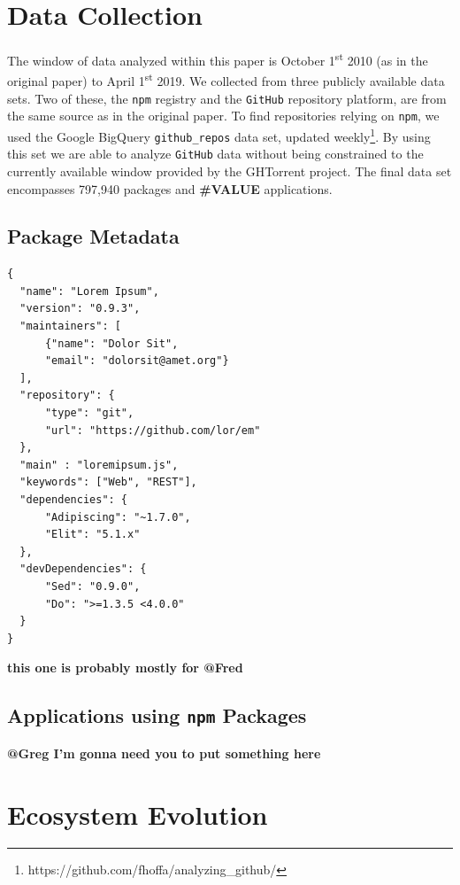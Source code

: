 \documentclass[10pt,conference]{IEEEtran}
\def\code#1{\texttt{#1}}
\begin{document}
\section{Data Collection}
The window of data analyzed within this paper is October 1\textsuperscript{st} 2010 (as in the original paper) to April 1\textsuperscript{st} 2019.
We collected from three publicly available data sets. Two of these, the \code{npm} registry and the \code{GitHub} repository platform, are from the same source as in the original paper.
To find repositories relying on \code{npm}, we used the Google BigQuery \code{github\_repos} data set, updated weekly\footnote{https://github.com/fhoffa/analyzing\_github/}.
By using this set we are able to analyze \code{GitHub} data without being constrained to the currently available window provided by the GHTorrent project\cite{Gousi13}.
The final data set encompasses 797,940 packages and \textbf{\#VALUE} applications.

\subsection{Package Metadata}

\begin{lstlisting}[caption={A mock \code{npm} package.json. Some fields omitted for brevity.},captionpos=b,
  label=samplePkg, frame=single, firstline=1]
{
  "name": "Lorem Ipsum",
  "version": "0.9.3",
  "maintainers": [
      {"name": "Dolor Sit",
      "email": "dolorsit@amet.org"}
  ],
  "repository": {
      "type": "git",
      "url": "https://github.com/lor/em"
  },
  "main" : "loremipsum.js",
  "keywords": ["Web", "REST"],
  "dependencies": {
      "Adipiscing": "~1.7.0",
      "Elit": "5.1.x"
  },
  "devDependencies": {
      "Sed": "0.9.0",
      "Do": ">=1.3.5 <4.0.0" 
  }
}
\end{lstlisting}


\textbf{this one is probably mostly for @Fred}

\subsection{Applications using \code{npm} Packages}

\textbf{@Greg I'm gonna need you to put something here}

\section{Ecosystem Evolution}
\end{document}
